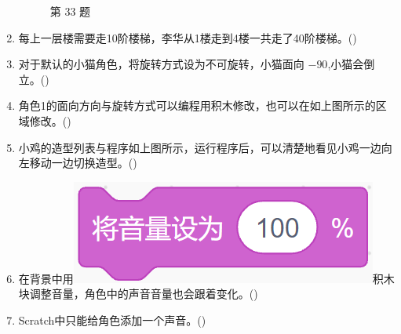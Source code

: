 \documentclass[10pt, a4paper]{article}
\begin{document}
\begin{enumerate}
\begin{figure}[htbp]
\begin{minipage}[t]{.18\textwidth}
                \caption*{第 33 题}
            \end{minipage}
        \end{figure}

        \item 每上一层楼需要走10阶楼梯，李华从1楼走到4楼一共走了40阶楼梯。(\qquad)

        \item 对于默认的小猫角色，将旋转方式设为不可旋转，小猫面向 $-90$,小猫会倒立。(\qquad)

        \item 角色1的面向方向与旋转方式可以编程用积木修改，也可以在如上图所示的区域修改。(\qquad)

        \item 小鸡的造型列表与程序如上图所示，运行程序后，可以清楚地看见小鸡一边向左移动一边切换造型。(\qquad)
        
        \item 在背景中用\includegraphics[width=.15\textwidth]{34.png}积木块调整音量，角色中的声音音量也会跟着变化。(\qquad)

        \item Scratch中只能给角色添加一个声音。(\qquad)
    \end{enumerate}
\end{document}
